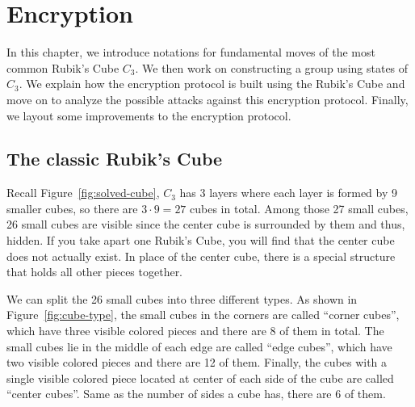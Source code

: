 \chapter{Encryption}\label{chap:encryption}
In this chapter, we introduce notations for fundamental moves of the most common Rubik's Cube $C_3$. We then work on constructing a group using states of $C_3$. We explain how the encryption protocol is built using the Rubik's Cube and move on to analyze the possible attacks against this encryption protocol. Finally, we layout some improvements to the encryption protocol.

\section{The classic Rubik's Cube}
\par Recall Figure~\ref{fig:solved-cube}, $C_3$ has 3 layers where each layer is formed by 9 smaller cubes, so there are $3 \cdot 9 = 27$ cubes in total. Among those 27 small cubes, 26 small cubes are visible since the center cube is surrounded by them and thus, hidden. If you take apart one Rubik's Cube, you will find that the center cube does not actually exist. In place of the center cube, there is a special structure that holds all other pieces together.
\par We can split the 26 small cubes into three different types. As shown in Figure~\ref{fig:cube-type}, the small cubes in the corners are called ``corner cubes'', which have three visible colored pieces and there are 8 of them in total. The small cubes lie in the middle of each edge are called ``edge cubes'', which have two visible colored pieces and there are 12 of them. Finally, the cubes with a single visible colored piece located at center of each side of the cube are called ``center cubes''. Same as the number of sides a cube has, there are 6 of them.
